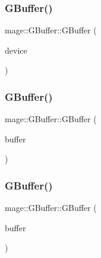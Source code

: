 \hypertarget{structmage_1_1_g_buffer_a7cb5a37658f5bc124a8c71d6a227d858}{}\label{structmage_1_1_g_buffer_a7cb5a37658f5bc124a8c71d6a227d858} 
\subsubsection{\texorpdfstring{G\+Buffer()}{GBuffer()}\hspace{0.1cm}{\footnotesize\ttfamily [2/4]}}
{\footnotesize\ttfamily mage\+::\+G\+Buffer\+::\+G\+Buffer (\begin{DoxyParamCaption}\item[{I\+D3\+D11\+Device2 $\ast$}]{device }\end{DoxyParamCaption})\hspace{0.3cm}{\ttfamily [explicit]}}

\hypertarget{structmage_1_1_g_buffer_a3d437fcd8cb2b2ceb2f7c8f06a6d2690}{}\label{structmage_1_1_g_buffer_a3d437fcd8cb2b2ceb2f7c8f06a6d2690} 
\subsubsection{\texorpdfstring{G\+Buffer()}{GBuffer()}\hspace{0.1cm}{\footnotesize\ttfamily [3/4]}}
{\footnotesize\ttfamily mage\+::\+G\+Buffer\+::\+G\+Buffer (\begin{DoxyParamCaption}\item[{const \hyperlink{structmage_1_1_g_buffer}{G\+Buffer} \&}]{buffer }\end{DoxyParamCaption})\hspace{0.3cm}{\ttfamily [delete]}}

\hypertarget{structmage_1_1_g_buffer_aa020a8c3b269d88d814c3664d03d03c6}{}\label{structmage_1_1_g_buffer_aa020a8c3b269d88d814c3664d03d03c6} 
\subsubsection{\texorpdfstring{G\+Buffer()}{GBuffer()}\hspace{0.1cm}{\footnotesize\ttfamily [4/4]}}
{\footnotesize\ttfamily mage\+::\+G\+Buffer\+::\+G\+Buffer (\begin{DoxyParamCaption}\item[{\hyperlink{structmage_1_1_g_buffer}{G\+Buffer} \&\&}]{buffer }\end{DoxyParamCaption})\hspace{0.3cm}{\ttfamily [default]}}

